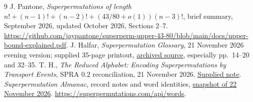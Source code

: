 \documentclass[11pt]{article}
\begin{document}
\begin{thebibliography}{9}\footnotesize
\setlength{\itemsep}{2pt}
 J. Pantone,
\emph{Superpermutations of length
$n!+(n-1)!+(n-2)!+(43/80+o(1))(n-3)!$}, brief summary,
September 2026, updated October 2026, Sections 2--7.
\url{https://github.com/jaypantone/superperm-upper-43-80/blob/main/docs/upper-bound-explained.pdf}.
 J. Halfar, \emph{Superpermutation Glossary},
21 November 2026 evening version; supplied 35-page printout,
\href{../../rllb/sources/Glossary.pdf}{archived source}, especially pp.~14--20 and 32--35.
 T. H., \emph{The Reduced Alphabet: Encoding Superpermutations
by Transport Events}, SPRA 0.2 reconciliation, 21 November 2026.
\href{../../rllb/sources/the-reduced-alphabet-spra-0.2-reconciled.md}{Supplied note}.
 \emph{Superpermutation Almanac}, record notes and word identities,
\href{../../rllb/almanac-snapshot.json}{snapshot of 22 November 2026}.
\url{https://superpermutations.com/api/words}.
\end{thebibliography}
\end{document}
